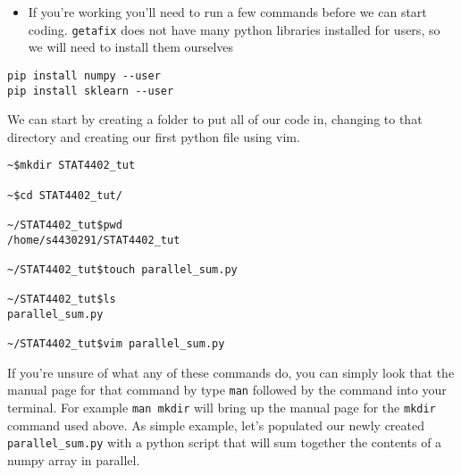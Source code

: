 \begin{itemize}
    \item If you're working you'll need to run a few commands before we can start coding. \texttt{getafix} does not have many python libraries installed for users, so we will need to install them ourselves
\end{itemize}

\begin{verbatim}
pip install numpy --user
pip install sklearn --user
\end{verbatim}

We can start by creating a folder to put all of our code in, changing to that directory and creating our first python file using vim.

\begin{verbatim}
~$mkdir STAT4402_tut

~$cd STAT4402_tut/

~/STAT4402_tut$pwd
/home/s4430291/STAT4402_tut

~/STAT4402_tut$touch parallel_sum.py

~/STAT4402_tut$ls
parallel_sum.py

~/STAT4402_tut$vim parallel_sum.py
\end{verbatim}

If you're unsure of what any of these commands do, you can simply look that the manual page for that command by type \texttt{man} followed by the command into your terminal. For example \texttt{man mkdir} will bring up the manual page for the \texttt{mkdir} command used above. As simple example, let's populated our newly created \texttt{parallel\_sum.py} with a python script that will sum together the contents of a numpy array in parallel.

